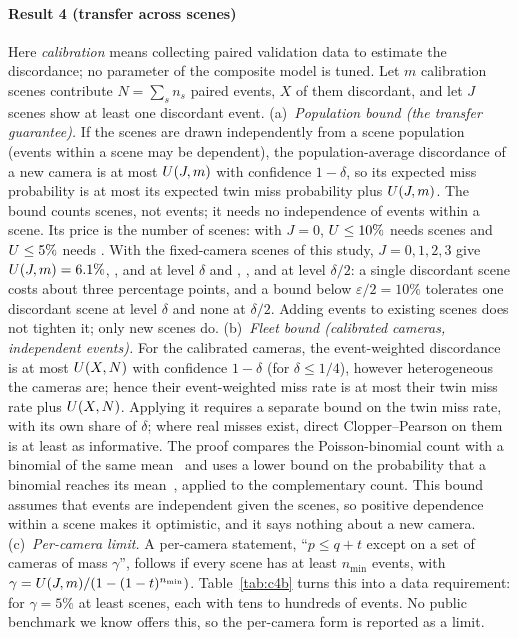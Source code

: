 \paragraph{Result 4 (transfer across scenes)}\label{res:c4} Here \emph{calibration} means collecting paired
validation data to estimate the discordance; no parameter of the composite model is tuned. Let $m$ calibration scenes contribute $N=\sum_sn_s$ paired
events, $X$ of them discordant, and let $J$ scenes show at least one discordant event.
(a)~\emph{Population bound (the transfer guarantee).} If the scenes are drawn independently from a scene population (events within a scene may be dependent), the population-average
discordance of a new camera is at most $U(J,m)$ with confidence $1-\delta$, so its expected miss probability is at most
its expected twin miss probability plus $U(J,m)$. The bound counts scenes, not events; it needs no independence of
events within a scene. Its price is the number of scenes: with $J=0$, $U\le10\%$ needs \nPopScenesTen{} scenes and
$U\le5\%$ needs \nPopScenesFive. With the \nMainScenes{} fixed-camera scenes of this study, $J=0,1,2,3$ give
$U(J,m)=6.1\%$, \nUpopJone, \nUpopJtwo{} and \nUpopJthree{} at level $\delta$ and \nUhalfJzero, \nUhalfJone,
\nUhalfJtwo{} and \nUhalfJthree{} at level $\delta/2$: a single discordant scene costs about three percentage points, and a
bound below $\varepsilon/2=10\%$ tolerates one discordant scene at level $\delta$ and none at $\delta/2$. Adding
events to existing scenes does not tighten it; only new scenes do.
(b)~\emph{Fleet bound (calibrated cameras, independent events).} For the calibrated cameras, the event-weighted discordance is at most $U(X,N)$ with confidence
$1-\delta$ (for $\delta\le 1/4$), however heterogeneous the cameras are; hence their event-weighted miss rate is at most
their twin miss rate plus $U(X,N)$. Applying it requires a separate bound on the twin miss rate, with its own share of $\delta$; where real misses exist,
direct Clopper--Pearson on them is at least as informative. The proof compares the Poisson-binomial count with a
binomial of the same mean~\cite{hoeffding1956} and uses a lower bound on the probability that a binomial reaches its mean~\cite{greenberg2014}, applied to the complementary count.
This bound assumes that events are independent given the scenes, so positive dependence within a scene makes
it optimistic, and it says nothing about a new camera.
(c)~\emph{Per-camera limit.} A per-camera statement, ``$p\le q+t$ except on a set of cameras of mass $\gamma$'', follows if
every scene has at least $n_{\min}$ events, with $\gamma=U(J,m)/(1-(1-t)^{n_{\min}})$. Table~\ref{tab:c4b} turns this
into a data requirement: for $\gamma=5\%$ at least \nPopScenesFive{} scenes, each with tens to hundreds of events. No
public benchmark we know offers this, so the per-camera form is reported as a limit.

